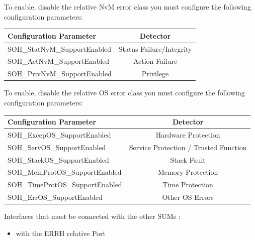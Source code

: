 To enable, disable the relative NvM error class you must configure the following configuration parameters:\newline
\begin{center}\begin{tabular}{|l|c|}
\hline
\textbf{Configuration Parameter}    & \textbf{Detector}               \\ \hline
SOH\_StatNvM\_SupportEnabled      &  Status Failure/Integrity       \\ \hline
SOH\_ActNvM\_SupportEnabled       &  Action Failure                 \\ \hline
SOH\_PrivNvM\_SupportEnabled      &  Privilege                      \\ \hline
\hline
\end{tabular}\end{center}

To enable, disable the relative OS error class you must configure the following configuration parameters:\newline

\begin{center}\begin{tabular}{|l|c|}
\hline
\textbf{Configuration Parameter}    & \textbf{Detector}                       \\ \hline
SOH\_ExcepOS\_SupportEnabled      & Hardware Protection                     \\ \hline
SOH\_ServOS\_SupportEnabled       & Service Protection / Trusted Function   \\ \hline
SOH\_StackOS\_SupportEnabled      & Stack Fault                             \\ \hline
SOH\_MemProtOS\_SupportEnabled    & Memory Protection                       \\ \hline
SOH\_TimeProtOS\_SupportEnabled   & Time Protection                         \\ \hline
SOH\_ErrOS\_SupportEnabled        & Other OS Errors                         \\ \hline
\hline
\end{tabular}\end{center}

Interfaces that must be connected with the other SUMs :

\begin{itemize}
    \item {} with the ERRH relative Port
\end{itemize}


